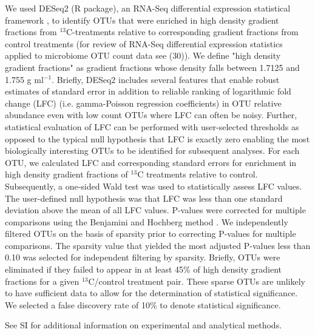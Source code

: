 We used DESeq2 (R package), an RNA-Seq differential expression statistical
framework \citep{love2014}, to identify OTUs that were enriched in high density
gradient fractions from $^{13}$C-treatments relative to corresponding gradient
fractions from control treatments (for review of RNA-Seq differential
expression statistics applied to microbiome OTU count data see (30)). We define
"high density gradient fractions" as gradient fractions whose density falls
between 1.7125 and 1.755 g ml$^{-1}$. Briefly, DESeq2 includes several features
that enable robust estimates of standard error in addition to reliable ranking
of logarithmic fold change (LFC) (i.e. gamma-Poisson regression coefficients)
in OTU relative abundance even with low count OTUs where LFC can often be
noisy. Further, statistical evaluation of LFC can be performed with
user-selected thresholds as opposed to the typical null hypothesis that LFC is
exactly zero enabling the most biologically interesting OTUs to be identified
for subsequent analyses. For each OTU, we calculated LFC and corresponding
standard errors for enrichment in high density gradient fractions of $^{13}$C
treatments relative to control. Subsequently, a one-sided Wald
test was used to statistically assess LFC values. The user-defined null
hypothesis was that LFC was less than one standard deviation
above the mean of all LFC values. P-values
were corrected for multiple comparisons using the Benjamini and Hochberg method
\citep{benjamini1995}. We independently filtered OTUs on the basis of sparsity
prior to correcting P-values for multiple comparisons. The sparsity value that
yielded the most adjusted P-values less than 0.10 was selected for independent
filtering by sparsity. Briefly, OTUs were eliminated if they failed to appear
in at least 45\% of high density gradient fractions for a given
$^{13}$C/control treatment pair. These sparse OTUs are unlikely to have
sufficient data to allow for the determination of statistical significance. We
selected a false discovery rate of 10\% to denote statistical significance.

See SI for additional information on experimental and analytical methods.
